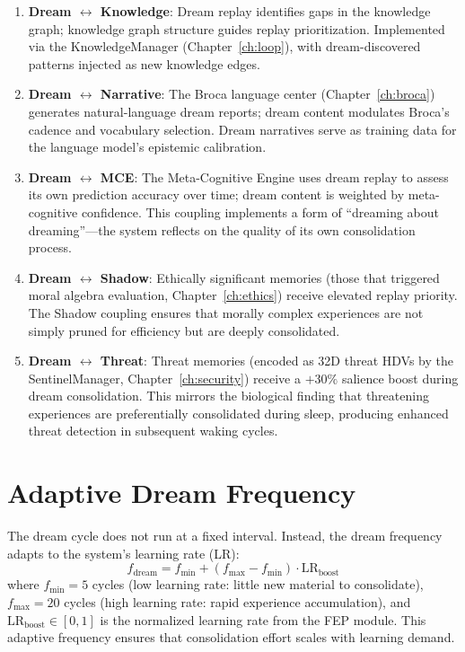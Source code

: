 \documentclass[12pt]{book}
\begin{document}
\begin{enumerate}[label=\arabic*.]
  \item \textbf{Dream $\leftrightarrow$ Knowledge}: Dream replay identifies gaps in the knowledge graph; knowledge graph structure guides replay prioritization. Implemented via the KnowledgeManager (Chapter~\ref{ch:loop}), with dream-discovered patterns injected as new knowledge edges.
  \item \textbf{Dream $\leftrightarrow$ Narrative}: The Broca language center (Chapter~\ref{ch:broca}) generates natural-language dream reports; dream content modulates Broca's cadence and vocabulary selection. Dream narratives serve as training data for the language model's epistemic calibration.
  \item \textbf{Dream $\leftrightarrow$ MCE}: The Meta-Cognitive Engine uses dream replay to assess its own prediction accuracy over time; dream content is weighted by meta-cognitive confidence. This coupling implements a form of ``dreaming about dreaming''---the system reflects on the quality of its own consolidation process.
  \item \textbf{Dream $\leftrightarrow$ Shadow}: Ethically significant memories (those that triggered moral algebra evaluation, Chapter~\ref{ch:ethics}) receive elevated replay priority. The Shadow coupling ensures that morally complex experiences are not simply pruned for efficiency but are deeply consolidated.
  \item \textbf{Dream $\leftrightarrow$ Threat}: Threat memories (encoded as 32D threat HDVs by the SentinelManager, Chapter~\ref{ch:security}) receive a $+30\%$ salience boost during dream consolidation. This mirrors the biological finding that threatening experiences are preferentially consolidated during sleep, producing enhanced threat detection in subsequent waking cycles.
\end{enumerate}

\section{Adaptive Dream Frequency}

The dream cycle does not run at a fixed interval. Instead, the dream frequency adapts to the system's learning rate (LR):
\begin{equation}
f_{\text{dream}} = f_{\min} + (f_{\max} - f_{\min}) \cdot \text{LR}_{\text{boost}}
\end{equation}
where $f_{\min} = 5$ cycles (low learning rate: little new material to consolidate), $f_{\max} = 20$ cycles (high learning rate: rapid experience accumulation), and $\text{LR}_{\text{boost}} \in [0,1]$ is the normalized learning rate from the FEP module. This adaptive frequency ensures that consolidation effort scales with learning demand.
\end{document}
